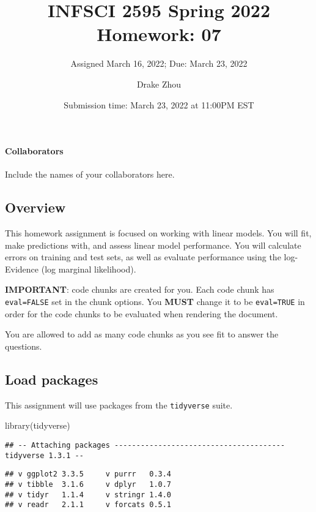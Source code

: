 \documentclass[
]{article}
\title{INFSCI 2595 Spring 2022 Homework: 07}
\subtitle{Assigned March 16, 2022; Due: March 23, 2022}
\author{Drake Zhou}
\date{Submission time: March 23, 2022 at 11:00PM EST}
\newenvironment{Shaded}{\begin{snugshade}}{\end{snugshade}}
\newcommand{\FunctionTok}[1]{\textcolor[rgb]{0.00,0.00,0.00}{#1}}
\newcommand{\NormalTok}[1]{#1}
\begin{document}
\maketitle

\hypertarget{collaborators}{%
\paragraph{Collaborators}\label{collaborators}}

Include the names of your collaborators here.

\hypertarget{overview}{%
\subsection{Overview}\label{overview}}

This homework assignment is focused on working with linear models. You
will fit, make predictions with, and assess linear model performance.
You will calculate errors on training and test sets, as well as evaluate
performance using the log-Evidence (log marginal likelihood).

\textbf{IMPORTANT}: code chunks are created for you. Each code chunk has
\texttt{eval=FALSE} set in the chunk options. You \textbf{MUST} change
it to be \texttt{eval=TRUE} in order for the code chunks to be evaluated
when rendering the document.

You are allowed to add as many code chunks as you see fit to answer the
questions.

\hypertarget{load-packages}{%
\subsection{Load packages}\label{load-packages}}

This assignment will use packages from the \texttt{tidyverse} suite.

\begin{Shaded}
\begin{Highlighting}[]
\FunctionTok{library}\NormalTok{(tidyverse)}
\end{Highlighting}
\end{Shaded}

\begin{verbatim}
## -- Attaching packages --------------------------------------- tidyverse 1.3.1 --
\end{verbatim}

\begin{verbatim}
## v ggplot2 3.3.5     v purrr   0.3.4
## v tibble  3.1.6     v dplyr   1.0.7
## v tidyr   1.1.4     v stringr 1.4.0
## v readr   2.1.1     v forcats 0.5.1
\end{verbatim}
\end{document}
